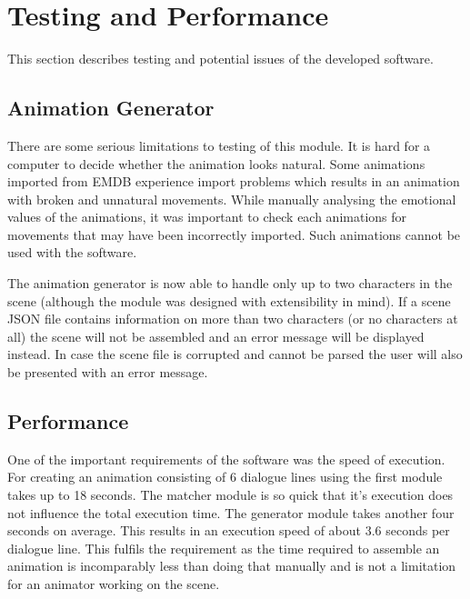 \chapter{Testing and Performance \label{chap:testingperf}}

This section describes testing and potential issues of the developed software.

\section{Animation Generator}
There are some serious limitations to testing of this module. It is hard for a computer to decide whether the animation looks natural. Some animations imported from EMDB experience import problems which results in an animation with broken and unnatural movements. While manually analysing the emotional values of the animations, it was important to check each animations for movements that may have been incorrectly imported. Such animations cannot be used with the software.

The animation generator is now able to handle only up to two characters in the scene (although the module was designed with extensibility in mind). If a scene JSON file contains information on more than two characters (or no characters at all) the scene will not be assembled and an error message will be displayed instead. In case the scene file is corrupted and cannot be parsed the user will also be presented with an error message.

\section{Performance}
One of the important requirements of the software was the speed of execution. For creating an animation consisting of 6 dialogue lines using the first module takes up to 18 seconds. The matcher module is so quick that it's execution does not influence the total execution time. The generator module takes another four seconds on average. This results in an execution speed of about 3.6 seconds per dialogue line. This fulfils the requirement as the time required to assemble an animation is incomparably less than doing that manually and is not a limitation for an animator working on the scene.
